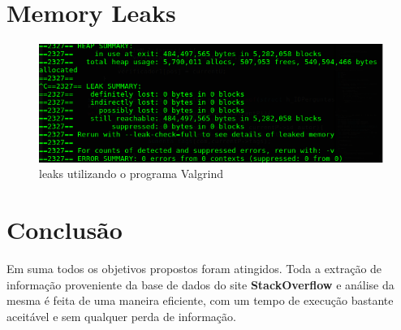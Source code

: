 \documentclass[a4paper]{article}
\begin{document}
\section {Memory Leaks}

\begin{figure}[ht]
\centering
\includegraphics[scale =0.50]{leaks.png}
\caption{leaks utilizando o programa Valgrind}
\label{img:leaks}
\end{figure}





\section{Conclusão}
Em suma todos os objetivos propostos foram atingidos. Toda a extração de informação proveniente da base de dados do site \textbf{StackOverflow} e análise da mesma é feita de uma maneira eficiente, com um tempo de execução bastante aceitável e sem qualquer perda de informação. 
\end{document}
